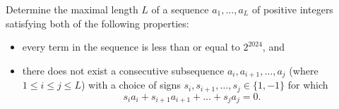 Determine the maximal length $L$ of a sequence $a_1, \dots, a_L$ of positive integers satisfying
both of the following properties:
\begin{itemize}
    \item every term in the sequence is less than or equal to $2^{2024}$, and
    \item there does not exist a consecutive subsequence $a_i, a_{i+1}, \dots, a_j$
    (where $1 \le i \le j \le L$) with a choice of signs $s_i, s_{i+1}, \dots, s_j \in \{1,-1\}$ for which
    $$s_ia_i + s_{i+1}a_{i+1} + \dots + s_ja_j = 0.$$
\end{itemize}
